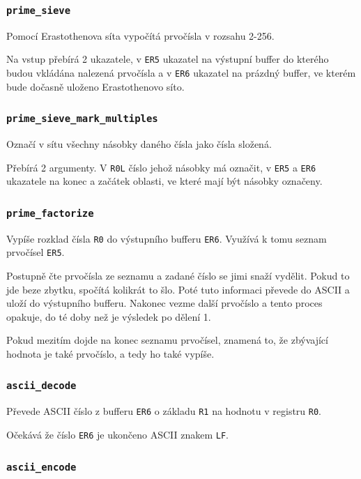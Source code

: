 \documentclass[12pt]{article}
\newcommand{\code}[1]{\mbox{\texttt{#1}}}
\begin{document}
\subsubsection{\code{prime\_sieve}}

Pomocí Erastothenova síta vypočítá prvočísla v rozsahu 2-256.

Na vstup přebírá 2 ukazatele, v \code{ER5} ukazatel na výstupní buffer do
kterého budou vkládána nalezená prvočísla a v \code{ER6} ukazatel na prázdný
buffer, ve kterém bude dočasně uloženo Erastothenovo síto.

\subsubsection{\code{prime\_sieve\_mark\_multiples}}

Označí v sítu všechny násobky daného čísla jako čísla složená.

Přebírá 2 argumenty. V \code{R0L} číslo jehož násobky má označit, v \code{ER5}
a \code{ER6} ukazatele na konec a začátek oblasti, ve které mají být násobky
označeny.

\subsubsection{\code{prime\_factorize}}

Vypíše rozklad čísla \code{R0} do výstupního bufferu \code{ER6}. Využívá k tomu seznam prvočísel
\code{ER5}.

Postupně čte prvočísla ze seznamu a zadané číslo se jimi snaží vydělit. Pokud
to jde beze zbytku, spočítá kolikrát to šlo. Poté tuto informaci převede do
ASCII a uloží do výstupního bufferu. Nakonec vezme další prvočíslo a tento
proces opakuje, do té doby než je výsledek po dělení 1.

Pokud mezitím dojde na konec seznamu prvočísel, znamená to, že zbývající
hodnota je také prvočíslo, a tedy ho také vypíše.

\subsubsection{\code{ascii\_decode}}

Převede ASCII číslo z bufferu \code{ER6} o základu \code{R1} na hodnotu v
registru \code{R0}.

Očekává že číslo \code{ER6} je ukončeno ASCII znakem \code{LF}.

\subsubsection{\code{ascii\_encode}}
\end{document}
